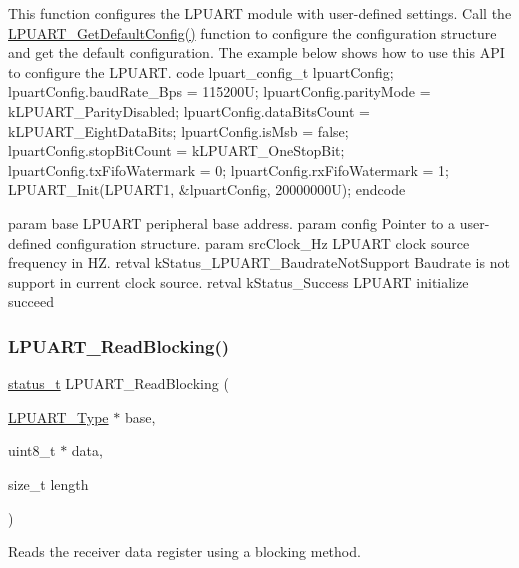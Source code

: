 This function configures the L\+P\+U\+A\+RT module with user-\/defined settings. Call the \mbox{\hyperlink{group__lpuart__driver_ga95dfe3c3886692f1fe32023d59708440}{L\+P\+U\+A\+R\+T\+\_\+\+Get\+Default\+Config()}} function to configure the configuration structure and get the default configuration. The example below shows how to use this A\+PI to configure the L\+P\+U\+A\+RT. code lpuart\+\_\+config\+\_\+t lpuart\+Config; lpuart\+Config.\+baud\+Rate\+\_\+\+Bps = 115200U; lpuart\+Config.\+parity\+Mode = k\+L\+P\+U\+A\+R\+T\+\_\+\+Parity\+Disabled; lpuart\+Config.\+data\+Bits\+Count = k\+L\+P\+U\+A\+R\+T\+\_\+\+Eight\+Data\+Bits; lpuart\+Config.\+is\+Msb = false; lpuart\+Config.\+stop\+Bit\+Count = k\+L\+P\+U\+A\+R\+T\+\_\+\+One\+Stop\+Bit; lpuart\+Config.\+tx\+Fifo\+Watermark = 0; lpuart\+Config.\+rx\+Fifo\+Watermark = 1; L\+P\+U\+A\+R\+T\+\_\+\+Init(\+L\+P\+U\+A\+R\+T1, \&lpuart\+Config, 20000000\+U); endcode

param base L\+P\+U\+A\+RT peripheral base address. param config Pointer to a user-\/defined configuration structure. param src\+Clock\+\_\+\+Hz L\+P\+U\+A\+RT clock source frequency in HZ. retval k\+Status\+\_\+\+L\+P\+U\+A\+R\+T\+\_\+\+Baudrate\+Not\+Support Baudrate is not support in current clock source. retval k\+Status\+\_\+\+Success L\+P\+U\+A\+RT initialize succeed \mbox{\label{group__lpuart__driver_gae76aba14dbfe94124082785e2c0ecd9d}} 
\subsubsection{\texorpdfstring{LPUART\_ReadBlocking()}{LPUART\_ReadBlocking()}}
{\footnotesize\ttfamily \mbox{\hyperlink{group__ksdk__common_gaaabdaf7ee58ca7269bd4bf24efcde092}{status\+\_\+t}} L\+P\+U\+A\+R\+T\+\_\+\+Read\+Blocking (\begin{DoxyParamCaption}\item[{\mbox{\hyperlink{struct_l_p_u_a_r_t___type}{L\+P\+U\+A\+R\+T\+\_\+\+Type}} $\ast$}]{base,  }\item[{uint8\+\_\+t $\ast$}]{data,  }\item[{size\+\_\+t}]{length }\end{DoxyParamCaption})}



Reads the receiver data register using a blocking method. 

